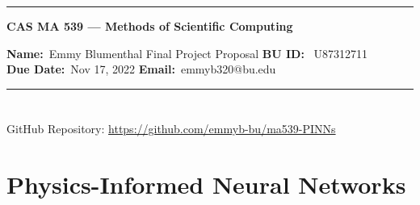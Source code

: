 \documentclass[10pt]{article}
\newcommand{\1}{\mathbf 1}
\begin{document}
\begin{center}
	\hrule
	\vspace{.4cm}
	{\textbf { \large CAS MA 539 --- Methods of Scientific Computing}}
\end{center}
\textbf{Name:}\ Emmy Blumenthal \hspace{\fill} Final Project Proposal\hspace{\fill}  \textbf{BU ID:} \ U87312711 \\
\textbf{Due Date:}\  Nov 17, 2022   \hspace{\fill} \textbf{Email:}\ emmyb320@bu.edu \ 
\vspace{.4cm}
\hrule

\section*{}

GitHub Repository:  \url{https://github.com/emmyb-bu/ma539-PINNs}

\section*{Physics-Informed Neural Networks}
\end{document}
